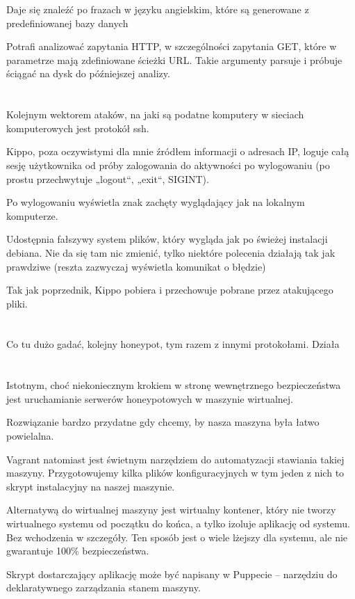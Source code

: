 \documentclass[runningheads,a4paper]{llncs}
\begin{document}
Daje się znaleźć po frazach w języku angielskim, które są generowane z predefiniowanej bazy danych

Potrafi analizować zapytania HTTP, w szczególności zapytania GET, które w parametrze mają zdefiniowane ścieżki URL. Takie argumenty parsuje i próbuje ściągać na dysk do późniejszej analizy.
\section{}
Kolejnym wektorem ataków, na jaki są podatne komputery w sieciach komputerowych jest protokół ssh.

Kippo, poza oczywistymi dla mnie źródłem informacji o adresach IP, loguje całą sesję użytkownika od próby zalogowania do aktywności po wylogowaniu (po prostu przechwytuje „logout“, „exit“, SIGINT).

Po wylogowaniu wyświetla znak zachęty wyglądający jak na lokalnym komputerze.

Udostępnia fałszywy system plików, który wygląda jak po świeżej instalacji debiana. Nie da się tam nic zmienić, tylko niektóre polecenia działają tak jak prawdziwe (reszta zazwyczaj wyświetla komunikat o błędzie)

Tak jak poprzednik, Kippo pobiera i przechowuje pobrane przez atakującego pliki.
\section{}
Co tu dużo gadać, kolejny honeypot, tym razem z innymi protokołami. Działa
\section{}
Istotnym, choć niekoniecznym krokiem w stronę wewnętrznego bezpieczeństwa jest uruchamianie serwerów honeypotowych w maszynie wirtualnej.

Rozwiązanie bardzo przydatne gdy chcemy, by nasza maszyna była łatwo powielalna.

Vagrant natomiast jest świetnym narzędziem do automatyzacji stawiania takiej maszyny. Przygotowujemy kilka plików konfiguracyjnych w tym jeden z nich to skrypt instalacyjny na naszej maszynie.

Alternatywą do wirtualnej maszyny jest wirtualny kontener, który nie tworzy wirtualnego systemu od początku do końca, a tylko izoluje aplikację od systemu. Bez wchodzenia w szczegóły. Ten sposób jest o wiele lżejszy dla systemu, ale nie gwarantuje 100\% bezpieczeństwa.

Skrypt dostarczający aplikację może być napisany w Puppecie – narzędziu do deklaratywnego zarządzania stanem maszyny.
\end{document}
